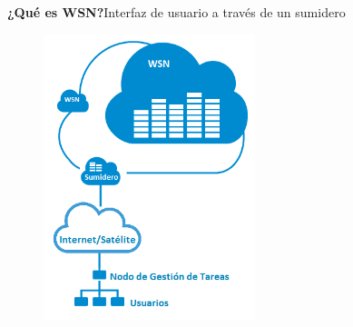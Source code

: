 \documentclass[aspectratio=43, handout]{beamer}
\begin{document}
\begin{frame}{\textbf{\LARGE{¿Qué es WSN?}}}{\LARGE{Interfaz de usuario a través de un sumidero}}
\fontsize{15pt}{15}\selectfont
		\begin{figure}[H]			
		\includegraphics[width=0.55\textwidth]{./imagenes/RedDistribuida.png}
		\end{figure}	  	  	
\end{frame}
\end{document}
